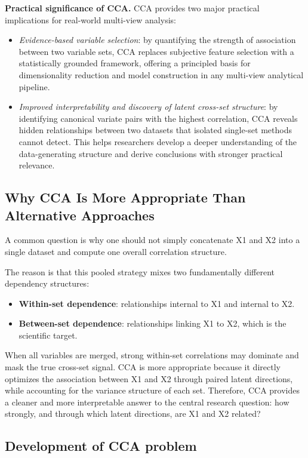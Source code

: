 \textbf{Practical significance of CCA.}
CCA provides two major practical implications for real-world multi-view analysis:
\begin{itemize}
    \item \textit{Evidence-based variable selection}: by quantifying the strength of association between two variable sets, CCA replaces subjective feature selection with a statistically grounded framework, offering a principled basis for dimensionality reduction and model construction in any multi-view analytical pipeline.

    \item \textit{Improved interpretability and discovery of latent cross-set structure}: by identifying canonical variate pairs with the highest correlation, CCA reveals hidden relationships between two datasets that isolated single-set methods cannot detect. This helps researchers develop a deeper understanding of the data-generating structure and derive conclusions with stronger practical relevance.
\end{itemize}

\subsection{Why CCA Is More Appropriate Than Alternative Approaches}
A common question is why one should not simply concatenate X1 and X2 into a single dataset and compute one overall correlation structure.

The reason is that this pooled strategy mixes two fundamentally different dependency structures:
\begin{itemize}[leftmargin=1.8em]
  \item \textbf{Within-set dependence}: relationships internal to X1 and internal to X2.
  \item \textbf{Between-set dependence}: relationships linking X1 to X2, which is the scientific target.
\end{itemize}

When all variables are merged, strong within-set correlations may dominate and mask the true cross-set signal.
CCA is more appropriate because it directly optimizes the association between X1 and X2 through paired latent directions, while accounting for the variance structure of each set. Therefore, CCA provides a cleaner and more interpretable answer to the central research question: how strongly, and through which latent directions, are X1 and X2 related?

\subsection{Development of CCA problem}


